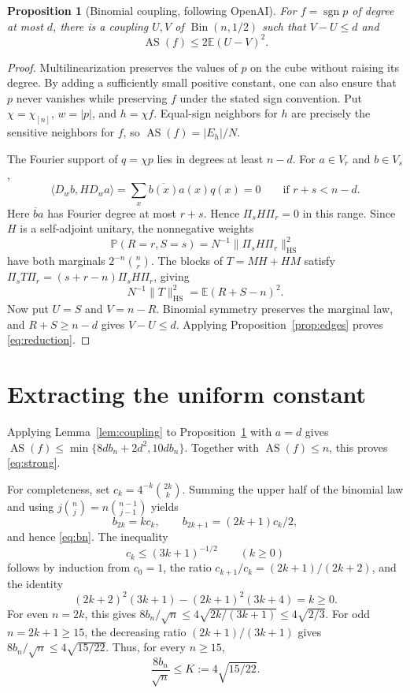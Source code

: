 \documentclass[11pt]{article}
\newtheorem{proposition}[theorem]{Proposition}
\theoremstyle{remark}
\newcommand{\E}{\mathbb E}
\newcommand{\Prob}{\mathbb P}
\newcommand{\AS}{\operatorname{AS}}
\newcommand{\sgn}{\operatorname{sgn}}
\newcommand{\HS}{\mathrm{HS}}
\begin{document}
\begin{proposition}[Binomial coupling, following OpenAI]\label{prop:reduction}
For $f=\sgn p$ of degree at most $d$, there is a coupling $U,V$ of
$\operatorname{Bin}(n,1/2)$ such that $V-U\le d$ and
\begin{equation}\label{eq:reduction}
 \AS(f)\le2\E(U-V)^2.
\end{equation}
\end{proposition}
\begin{proof}
Multilinearization preserves the values of $p$ on the cube without raising
its degree. By adding a sufficiently small positive constant, one can
also ensure that $p$ never vanishes while preserving $f$ under the stated
sign convention. Put
$\chi=\chi_{[n]}$, $w=|p|$, and $h=\chi f$.
Equal-sign neighbors for $h$ are precisely the sensitive neighbors for
$f$, so $\AS(f)=|E_h|/N$.

The Fourier support of $q=\chi p$ lies in degrees at least $n-d$.
For $a\in V_r$ and $b\in V_s$,
\[
 \langle D_wb,HD_wa\rangle=\sum_x\overline{b(x)}a(x)q(x)=0
 \qquad\text{if }r+s<n-d.
\]
Here $\overline b a$ has Fourier degree at most $r+s$.
Hence $\Pi_sH\Pi_r=0$ in this range.
Since $H$ is a self-adjoint unitary, the nonnegative weights
\[
 \Prob(R=r,S=s)=N^{-1}\|\Pi_sH\Pi_r\|_{\HS}^2
\]
have both marginals $2^{-n}\binom nr$.
The blocks of $T=MH+HM$ satisfy
$\Pi_sT\Pi_r=(s+r-n)\Pi_sH\Pi_r$, giving
\[
 N^{-1}\|T\|_{\HS}^2=\E(R+S-n)^2.
\]
Now put $U=S$ and $V=n-R$. Binomial symmetry preserves the marginal
law, and $R+S\ge n-d$ gives $V-U\le d$. Applying
Proposition~\ref{prop:edges} proves \eqref{eq:reduction}.
\end{proof}

\section{Extracting the uniform constant}
Applying Lemma~\ref{lem:coupling} to Proposition~\ref{prop:reduction}
with $a=d$ gives
$\AS(f)\le\min\{8d b_n+2d^2,10d b_n\}$.
Together with $\AS(f)\le n$, this proves \eqref{eq:strong}.

For completeness, set $c_k=4^{-k}\binom{2k}{k}$.
Summing the upper half of the binomial law and using
$j\binom nj=n\binom{n-1}{j-1}$ yields
\[
 b_{2k}=kc_k,\qquad b_{2k+1}=(2k+1)c_k/2,
\]
and hence \eqref{eq:bn}.
The inequality
\begin{equation}\label{eq:central}
 c_k\le(3k+1)^{-1/2}\qquad(k\ge0)
\end{equation}
follows by induction from $c_0=1$, the ratio
$c_{k+1}/c_k=(2k+1)/(2k+2)$, and the identity
\[
 (2k+2)^2(3k+1)-(2k+1)^2(3k+4)=k\ge0.
\]
For even $n=2k$, this gives
$8b_n/\sqrt n\le4\sqrt{2k/(3k+1)}\le4\sqrt{2/3}$.
For odd $n=2k+1\ge15$, the decreasing ratio
$(2k+1)/(3k+1)$ gives
$8b_n/\sqrt n\le4\sqrt{15/22}$.
Thus, for every $n\ge15$,
\begin{equation}\label{eq:K}
 \frac{8b_n}{\sqrt n}\le K:=4\sqrt{15/22}.
\end{equation}
\end{document}
